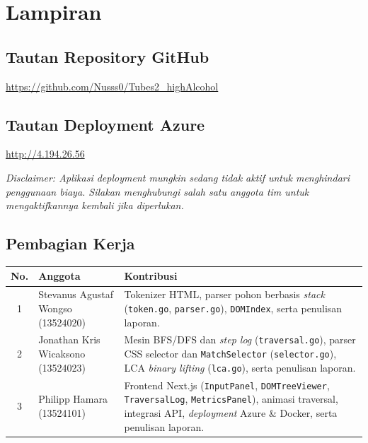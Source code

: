 \chapter*{Lampiran}

\section*{Tautan Repository GitHub}

\begin{center}
\url{https://github.com/Nusss0/Tubes2_highAlcohol}
\end{center}

\section*{Tautan Deployment Azure}
\begin{center}
\url{http://4.194.26.56}
\end{center}
\noindent\textit{Disclaimer: Aplikasi deployment mungkin sedang tidak aktif untuk menghindari penggunaan biaya. Silakan menghubungi salah satu anggota tim untuk mengaktifkannya kembali jika diperlukan.}

\section*{Pembagian Kerja}

\begin{table}[H]
\centering
\begin{tabular}{|c|l|p{7.5cm}|}
\hline
\textbf{No.} & \textbf{Anggota} & \textbf{Kontribusi} \\
\hline
1 & Stevanus Agustaf Wongso (13524020) & Tokenizer HTML, parser pohon berbasis \textit{stack} (\texttt{token.go}, \texttt{parser.go}), \texttt{DOMIndex}, serta penulisan laporan. \\
\hline
2 & Jonathan Kris Wicaksono (13524023) & Mesin BFS/DFS dan \textit{step log} (\texttt{traversal.go}), parser CSS selector dan \texttt{MatchSelector} (\texttt{selector.go}), LCA \textit{binary lifting} (\texttt{lca.go}), serta penulisan laporan. \\
\hline
3 & Philipp Hamara (13524101) & Frontend Next.js (\texttt{InputPanel}, \texttt{DOMTreeViewer}, \texttt{TraversalLog}, \texttt{MetricsPanel}), animasi traversal, integrasi API, \textit{deployment} Azure \& Docker, serta penulisan laporan. \\
\hline
\end{tabular}
\end{table}


